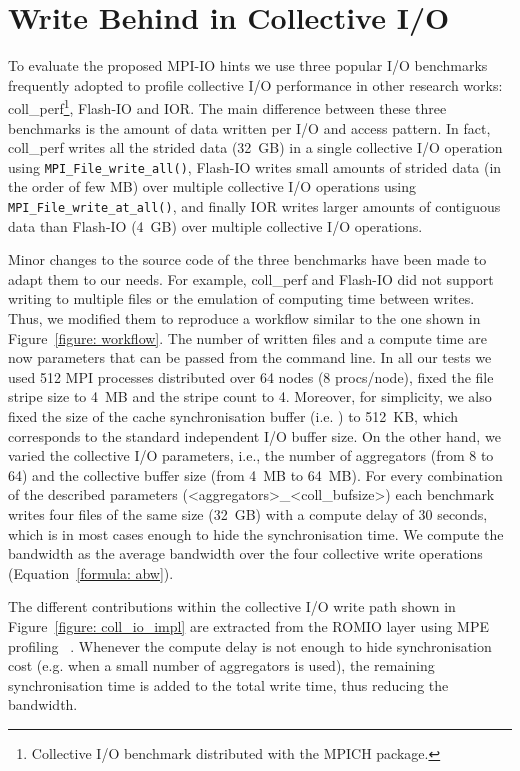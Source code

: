 \section{Write Behind in Collective I/O}
To evaluate the proposed MPI-IO hints we use three popular I/O benchmarks frequently adopted to profile collective I/O performance in other research works: 
coll\_perf\footnote{Collective I/O benchmark distributed with the MPICH package.}, Flash-IO and IOR. The main difference between these three benchmarks is 
the amount of data written per I/O and access pattern. In fact, coll\_perf writes all the strided data (32~GB) in a single collective I/O operation using 
\texttt{MPI\_File\_write\_all()}, Flash-IO writes small amounts of strided data (in the order of few MB) over multiple collective I/O operations using 
\texttt{MPI\_File\_write\_at\_all()}, and finally IOR writes larger amounts of contiguous data than Flash-IO (4~GB) over multiple collective I/O operations.

Minor changes to the source code of the three benchmarks have been made to adapt them to our needs. For example, coll\_perf and Flash-IO did not support writing 
to multiple files or the emulation of computing time between writes. Thus, we modified them to reproduce a workflow similar to the one shown in Figure~\ref{figure: workflow}. 
The number of written files and a compute time are now parameters that can be passed from the command line. In all our tests we used 512 MPI processes distributed over 
64 nodes (8 procs/node), fixed the file stripe size to 4~MB and the stripe count to 4. Moreover, for simplicity, we also fixed the size of the cache synchronisation 
buffer (i.e. ) to 512~KB, which corresponds to the standard independent I/O buffer size. On the other hand, we varied the collective 
I/O parameters, i.e., the number of aggregators (from 8 to 64) and the collective buffer size (from 4~MB to 64~MB). 
For every combination of the described parameters (<aggregators>\_<coll\_bufsize>) each benchmark writes four files of the same size (32~GB) with a compute delay of 30 seconds, 
which is in most cases enough to hide the synchronisation time. We compute the bandwidth as the average bandwidth over the four collective write operations (Equation~\ref{formula: abw}). 

The different contributions within the collective I/O write path shown in Figure~\ref{figure: coll_io_impl} are extracted from the ROMIO layer using MPE profiling
~\cite{Gropp2014}. Whenever the compute delay is not enough to hide synchronisation cost (e.g. when a small number of aggregators is used), the remaining synchronisation 
time is added to the total write time, thus reducing the bandwidth.

